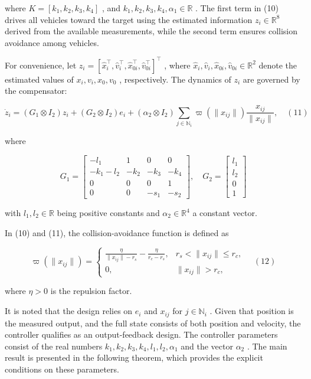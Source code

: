 where  $K = [k_1, k_2, k_3, k_4]$ , and  $k_1, k_2, k_3, k_4, \alpha_1 \in \mathbb{R}$ . The first term in (10) drives all vehicles toward the target using the estimated information  $z_i \in \mathbb{R}^8$  derived from the available measurements, while the second term ensures collision avoidance among vehicles.

For convenience, let  $z_i = [\hat{x}_i^\top, \hat{v}_i^\top, \hat{x}_{0i}^\top, \hat{v}_{0i}^\top]^\top$ , where  $\hat{x}_i, \hat{v}_i, \hat{x}_{0i}, \hat{v}_{0i} \in \mathbb{R}^2$  denote the estimated values of  $x_i, v_i, x_0, v_0$ , respectively. The dynamics of  $z_i$  are governed by the compensator:

$$\dot{z}_i = (G_1 \otimes I_2)z_i + (G_2 \otimes I_2)e_i + (\alpha_2 \otimes I_2) \sum_{j \in \mathbb{N}_i} \varpi(\|x_{ij}\|) \frac{x_{ij}}{\|x_{ij}\|}, \quad (11)$$

where

$$G_1 = \begin{bmatrix} -l_1 & 1 & 0 & 0 \\ -k_1 - l_2 & -k_2 & -k_3 & -k_4 \\ 0 & 0 & 0 & 1 \\ 0 & 0 & -s_1 & -s_2 \end{bmatrix}, \quad G_2 = \begin{bmatrix} l_1 \\ l_2 \\ 0 \\ 1 \end{bmatrix}$$

with  $l_1, l_2 \in \mathbb{R}$  being positive constants and  $\alpha_2 \in \mathbb{R}^4$  a constant vector.

In (10) and (11), the collision-avoidance function is defined as

$$\varpi(\|x_{ij}\|) = \begin{cases} \frac{\eta}{\|x_{ij}\| - r_s} - \frac{\eta}{r_c - r_s}, & r_s < \|x_{ij}\| \leq r_c, \\ 0, & \|x_{ij}\| > r_c, \end{cases} \quad (12)$$

where  $\eta > 0$  is the repulsion factor.

It is noted that the design relies on  $e_i$  and  $x_{ij}$  for  $j \in \mathbb{N}_i$ . Given that position is the measured output, and the full state consists of both position and velocity, the controller qualifies as an output-feedback design. The controller parameters consist of the real numbers  $k_1, k_2, k_3, k_4, l_1, l_2, \alpha_1$  and the vector  $\alpha_2$ . The main result is presented in the following theorem, which provides the explicit conditions on these parameters.

